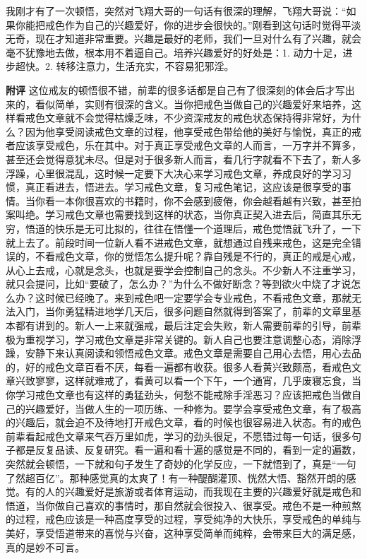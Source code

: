 \begin{case}
    我刚才有了一次顿悟，突然对飞翔大哥的一句话有很深的理解，飞翔大哥说：“如果你能把戒色作为自己的兴趣爱好，你的进步会很快的。”刚看到这句话时觉得平淡无奇，现在才知道非常重要。兴趣是最好的老师，我们一旦对什么有了兴趣，就会毫不犹豫地去做，根本用不着逼自己。培养兴趣爱好的好处是：1. 动力十足，进步超快。2. 转移注意力，生活充实，不容易犯邪淫。

    \textbf{附评} 这位戒友的顿悟很不错，前辈的很多话都是自己有了很深刻的体会后才写出来的，看似简单，实则有很深的含义。当你把戒色当做自己的兴趣爱好来培养，这样看戒色文章就不会觉得枯燥乏味，不少资深戒友的戒色状态保持得非常好，为什么？因为他享受阅读戒色文章的过程，他享受戒色带给他的美好与愉悦，真正的戒者应该享受戒色，乐在其中。对于真正享受戒色文章的人而言，一万字并不算多，甚至还会觉得意犹未尽。但是对于很多新人而言，看几行字就看不下去了，新人多浮躁，心里很混乱，这时候一定要下大决心来学习戒色文章，养成良好的学习习惯，真正看进去，悟进去。学习戒色文章，复习戒色笔记，这应该是很享受的事情。当你看一本你很喜欢的书籍时，你不会感到疲倦，你会越看越有兴致，甚至拍案叫绝。学习戒色文章也需要找到这样的状态，当你真正契入进去后，简直其乐无穷，悟道的快乐是无可比拟的，往往在悟懂一个道理后，戒色觉悟就飞升了，一下就上去了。前段时间一位新人看不进戒色文章，就想通过自残来戒色，这是完全错误的，不看戒色文章，你的觉悟怎么提升呢？靠自残是不行的，真正的戒是心戒，从心上去戒，心就是念头，也就是要学会控制自己的念头。不少新人不注重学习，就只会提问，比如“要破了，怎么办？”为什么不做好断念？等到欲火中烧了才说怎么办？这时候已经晚了。来到戒色吧一定要学会专业戒色，不看戒色文章，那就无法入门，当你勇猛精进地学几天后，很多问题自然就得到答案了，前辈的文章里基本都有讲到的。新人一上来就强戒，最后注定会失败，新人需要前辈的引导，前辈极为重视学习，学习戒色文章是非常关键的。新人自己也要注意调整心态，消除浮躁，安静下来认真阅读和领悟戒色文章。戒色文章是需要自己用心去悟，用心去品的，好的戒色文章百看不厌，每看一遍都有收获。很多人看黄兴致颇高，看戒色文章兴致寥寥，这样就难戒了，看黄可以看一个下午，一个通宵，几乎废寝忘食，当你学习戒色文章也有这样的勇猛劲头，何愁不能戒除手淫恶习？应该把戒色当做自己的兴趣爱好，当做人生的一项历练、一种修为。要学会享受戒色文章，有了极高的兴趣后，就会迫不及待地打开戒色文章，看的时候也很容易进入状态。有的戒色前辈看起戒色文章来气吞万里如虎，学习的劲头很足，不愿错过每一句话，很多句子都是反复品读、反复研究。看一遍和看十遍的感觉是不同的，看到一定的遍数，突然就会顿悟，一下就和句子发生了奇妙的化学反应，一下就悟到了，真是“一句了然超百亿”。那种感觉真的太爽了！有一种醍醐灌顶、恍然大悟、豁然开朗的感觉。有的人的兴趣爱好是旅游或者体育运动，而我现在主要的兴趣爱好就是戒色和悟道，当你做自己喜欢的事情时，那自然就会很投入、很享受。戒色不是一种煎熬的过程，戒色应该是一种高度享受的过程，享受纯净的大快乐，享受戒色的单纯与美好，享受悟道带来的喜悦与兴奋，这种享受简单而纯粹，会带来巨大的满足感，真的是妙不可言。
\end{case}

